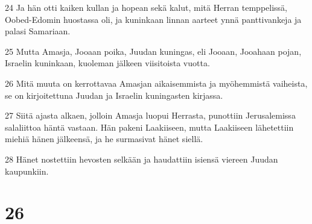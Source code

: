 \par 24 Ja hän otti kaiken kullan ja hopean sekä kalut, mitä Herran temppelissä, Oobed-Edomin huostassa oli, ja kuninkaan linnan aarteet ynnä panttivankeja ja palasi Samariaan.
\par 25 Mutta Amasja, Jooaan poika, Juudan kuningas, eli Jooaan, Jooahaan pojan, Israelin kuninkaan, kuoleman jälkeen viisitoista vuotta.
\par 26 Mitä muuta on kerrottavaa Amasjan aikaisemmista ja myöhemmistä vaiheista, se on kirjoitettuna Juudan ja Israelin kuningasten kirjassa.
\par 27 Siitä ajasta alkaen, jolloin Amasja luopui Herrasta, punottiin Jerusalemissa salaliittoa häntä vastaan. Hän pakeni Laakiiseen, mutta Laakiiseen lähetettiin miehiä hänen jälkeensä, ja he surmasivat hänet siellä.
\par 28 Hänet nostettiin hevosten selkään ja haudattiin isiensä viereen Juudan kaupunkiin.

\chapter{26}

